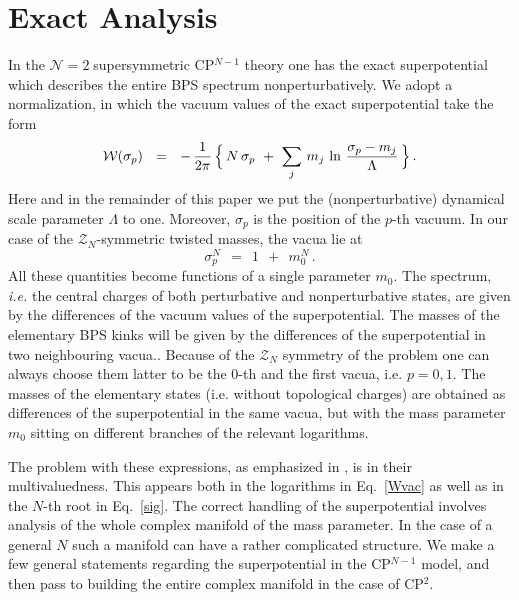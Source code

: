 \documentclass[epsfig,12pt]{article}
\def\beq{\begin{equation}}
\def\eeq{\end{equation}}
\newcommand{\ntwo}{${\mathcal N}=2\;$}
\def\beq{\begin{equation}}
\def\eeq{\end{equation}}
\newcommand{\mc}[1]{\mathcal{#1}}
\newcommand{\W}{\mathcal{W}}
\begin{document}
\section{Exact Analysis}
\setcounter{equation}{0}
\label{exact}

	In the \ntwo supersymmetric CP$^{N-1}$ theory one has the exact superpotential which
	  describes the entire BPS  spectrum nonperturbatively.
	We adopt a normalization, in which the vacuum values of the exact superpotential take 
	the form
\beq
\label{Wvac}
	\W ( \sigma_p ) ~~=~~ 
		-\, \frac{1}{2\pi}\,  
                \Bigl\{\, N\, \sigma_p ~+~ \sum_j\, m_j\, \ln \,\frac{\sigma_p - m_j}{\Lambda} \,\Bigr\}\,.
\eeq
	Here and in the remainder of this   paper we put the (nonperturbative) dynamical scale parameter $ \Lambda $ to one.
	Moreover, $ \sigma_p $ is   the position of the $p$-th vacuum.
	In our case of the $ \mc{Z}_N $-symmetric twisted masses, the vacua lie at
\beq
\label{sig}
	\sigma_p^N  ~~=~~ 1 ~~+~~ m_0^N \,.
\eeq
	All these quantities become functions of a single parameter $ m_0 $.
	The spectrum, {\it i.e.} the central charges of both perturbative and nonperturbative states,
	are given by the differences of the vacuum values of the superpotential.
	The masses of the elementary BPS kinks will be given by the differences of the superpotential in
	two neighbouring vacua..
	Because of the $ \mc{Z}_N $ symmetry of the problem one can always choose them latter to be 
	the 0-th and the first vacua,  i.e. $p=0,1$.
	The masses of the elementary states (i.e. without topological charges) are obtained as differences of the superpotential in the
	same vacua, but with the mass parameter $ m_0 $ sitting on different branches of 
	the relevant logarithms.

	The problem with these expressions, as emphasized in \cite{Bolokhov:2011mp}, is in their 
	multiva\-luedness.
	This appears both in the logarithms in Eq.~\eqref{Wvac} as well as in the $ N $-th root in Eq.~\eqref{sig}.
	The correct handling of the superpotential involves analysis of the whole complex manifold
	of the mass parameter.
	In the case of a general $ N $ such a manifold can have a rather complicated structure.
	We make a few general statements regarding the superpotential in the CP$^{N-1}$ model, and then pass
	to building the entire complex manifold in the case of CP$^2$.
\end{document}
